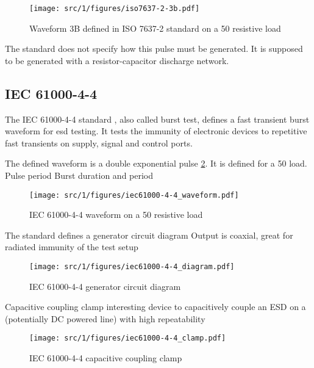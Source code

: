 \begin{figure}[!h]
  \centering
  \texttt{[image: src/1/figures/iso7637-2-3b.pdf]}
  \caption{Waveform 3B defined in ISO 7637-2 standard on a 50\textOmega{} resistive load}
  \label{fig:iso_2b_pulse}
\end{figure}

The standard does not specify how this pulse must be generated.
It is supposed to be generated with a resistor-capacitor discharge network.

\subsection{IEC 61000-4-4}

The IEC 61000-4-4 standard \cite{iec61000-4-4}, also called burst test, defines a fast transient burst waveform for \gls{esd} testing.
It tests the immunity of electronic devices to repetitive fast transients on supply, signal and control ports.

The defined waveform is a double exponential pulse \ref{fig:iec_4_4_pulse}.
It is defined for a 50\textOmega{} load.
Pulse period
Burst duration and period

\begin{figure}[!h]
  \centering
  \texttt{[image: src/1/figures/iec61000-4-4\_waveform.pdf]}
  \caption{IEC 61000-4-4 waveform on a 50\textOmega{} resistive load}
  \label{fig:iec_4_4_pulse}
\end{figure}

The standard defines a generator circuit diagram
Output is coaxial, great for radiated immunity of the test setup

\begin{figure}[!h]
  \centering
  \texttt{[image: src/1/figures/iec61000-4-4\_diagram.pdf]}
  \caption{IEC 61000-4-4 generator circuit diagram}
  \label{fig:iec_4_4_generator}
\end{figure}

Capacitive coupling clamp
interesting device to capacitively couple an ESD on a (potentially DC powered line) with high repeatability

\begin{figure}[!h]
  \centering
  \texttt{[image: src/1/figures/iec61000-4-4\_clamp.pdf]}
  \caption{IEC 61000-4-4 capacitive coupling clamp}
  \label{fig:iec_4_4_clamp}
\end{figure}

